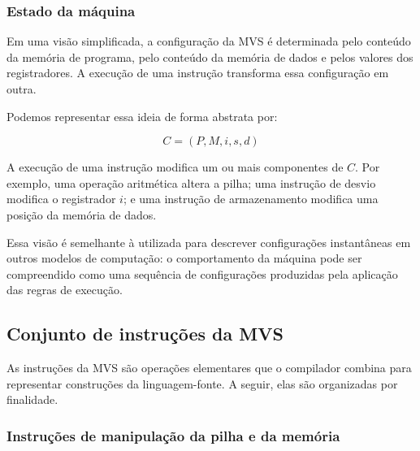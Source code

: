 \documentclass[
  brazilian,
  letterpaper,
]{book}
\theoremstyle{plain}
\theoremstyle{definition}
\theoremstyle{remark}
\begin{document}
\subsubsection{Estado da máquina}\label{estado-da-muxe1quina}

Em uma visão simplificada, a configuração da MVS é determinada pelo
conteúdo da memória de programa, pelo conteúdo da memória de dados e
pelos valores dos registradores. A execução de uma instrução transforma
essa configuração em outra.

Podemos representar essa ideia de forma abstrata por:

\[
C = (P,M,i,s,d)
\]

A execução de uma instrução modifica um ou mais componentes de \(C\).
Por exemplo, uma operação aritmética altera a pilha; uma instrução de
desvio modifica o registrador \(i\); e uma instrução de armazenamento
modifica uma posição da memória de dados.

Essa visão é semelhante à utilizada para descrever configurações
instantâneas em outros modelos de computação: o comportamento da máquina
pode ser compreendido como uma sequência de configurações produzidas
pela aplicação das regras de execução.

\subsection{Conjunto de instruções da
MVS}\label{conjunto-de-instruuxe7uxf5es-da-mvs}

As instruções da MVS são operações elementares que o compilador combina
para representar construções da linguagem-fonte. A seguir, elas são
organizadas por finalidade.

\subsubsection{Instruções de manipulação da pilha e da
memória}\label{instruuxe7uxf5es-de-manipulauxe7uxe3o-da-pilha-e-da-memuxf3ria}
\end{document}
